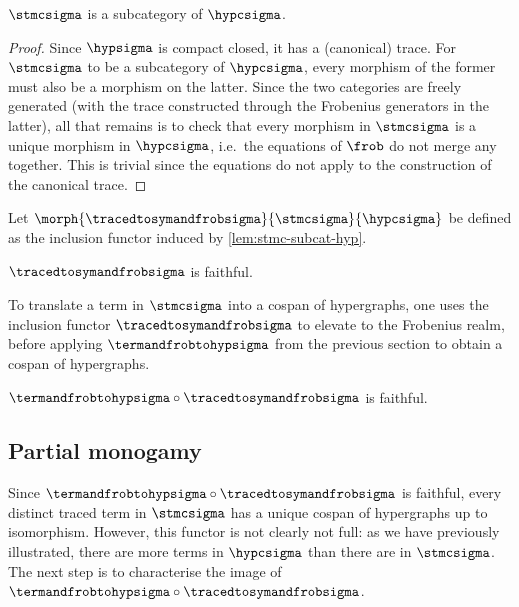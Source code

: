 \begin{lemma}
    \label{lem:stmc-subcat-hyp}
    \(\stmcsigma\) is a subcategory of \(\hypcsigma\).
\end{lemma}
\begin{proof}
    Since \(\hypsigma\) is compact closed, it has a (canonical) trace.
    For \(\stmcsigma\) to be a subcategory of \(\hypcsigma\), every morphism
    of the former must also be a morphism on the latter.
    Since the two categories are freely generated (with the trace constructed
    through the Frobenius generators in the latter), all that remains is to
    check that every morphism in \(\stmcsigma\) is a unique morphism in
    \(\hypcsigma\), i.e.\ the equations of \(\frob\) do not merge any together.
    This is trivial since the equations do not apply to the construction of the
    canonical trace.
\end{proof}

\begin{definition}
    Let \(\morph{\tracedtosymandfrobsigma}{\stmcsigma}{\hypcsigma}\) be defined
    as the inclusion functor induced by \cref{lem:stmc-subcat-hyp}.
\end{definition}

\begin{corollary}
    \(\tracedtosymandfrobsigma\) is faithful.
\end{corollary}

To translate a term in \(\stmcsigma\) into a cospan of hypergraphs, one uses
the inclusion functor \(\tracedtosymandfrobsigma\) to elevate to the
Frobenius realm, before applying \(\termandfrobtohypsigma\) from the previous
section to obtain a cospan of hypergraphs.

\begin{corollary}
    \(\termandfrobtohypsigma \circ \tracedtosymandfrobsigma\) is faithful.
\end{corollary}

\subsection{Partial monogamy}

Since \(\termandfrobtohypsigma \circ \tracedtosymandfrobsigma\) is faithful,
every distinct traced term in \(\stmcsigma\) has a unique cospan of
hypergraphs up to isomorphism.
However, this functor is not clearly not full: as we have previously
illustrated, there are more terms in \(\hypcsigma\) than there are in
\(\stmcsigma\).
The next step is to characterise the image of
\(\termandfrobtohypsigma \circ \tracedtosymandfrobsigma\).

